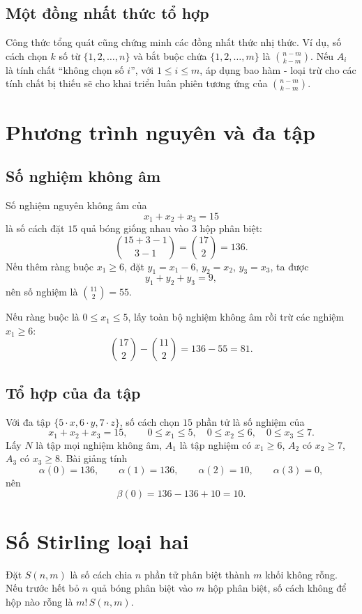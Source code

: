 \documentclass[11pt]{article}
\newcommand{\C}[2]{\binom{#1}{#2}}
\begin{document}
\subsection{Một đồng nhất thức tổ hợp}

Công thức tổng quát cũng chứng minh các đồng nhất thức nhị thức. Ví dụ, số
cách chọn \(k\) số từ \(\{1,2,\ldots,n\}\) và bắt buộc chứa
\(\{1,2,\ldots,m\}\) là \(\C{n-m}{k-m}\). Nếu \(A_i\) là tính chất ``không
chọn số \(i\)'', với \(1\le i\le m\), áp dụng bao hàm - loại trừ cho các tính
chất bị thiếu sẽ cho khai triển luân phiên tương ứng của \(\C{n-m}{k-m}\).

\section{Phương trình nguyên và đa tập}

\subsection{Số nghiệm không âm}

Số nghiệm nguyên không âm của
\[
  x_1+x_2+x_3=15
\]
là số cách đặt \(15\) quả bóng giống nhau vào \(3\) hộp phân biệt:
\[
  \C{15+3-1}{3-1}=\C{17}{2}=136.
\]
Nếu thêm ràng buộc \(x_1\ge6\), đặt \(y_1=x_1-6\), \(y_2=x_2\), \(y_3=x_3\),
ta được
\[
  y_1+y_2+y_3=9,
\]
nên số nghiệm là \(\C{11}{2}=55\).

Nếu ràng buộc là \(0\le x_1\le5\), lấy toàn bộ nghiệm không âm rồi trừ các
nghiệm \(x_1\ge6\):
\[
  \C{17}{2}-\C{11}{2}=136-55=81.
\]

\subsection{Tổ hợp của đa tập}

Với đa tập \(\{5\cdot x,6\cdot y,7\cdot z\}\), số cách chọn \(15\) phần tử là
số nghiệm của
\[
  x_1+x_2+x_3=15,\qquad
  0\le x_1\le5,\quad 0\le x_2\le6,\quad 0\le x_3\le7.
\]
Lấy \(N\) là tập mọi nghiệm không âm, \(A_1\) là tập nghiệm có \(x_1\ge6\),
\(A_2\) có \(x_2\ge7\), \(A_3\) có \(x_3\ge8\). Bài giảng tính
\[
  \alpha(0)=136,\qquad \alpha(1)=136,\qquad
  \alpha(2)=10,\qquad \alpha(3)=0,
\]
nên
\[
  \beta(0)=136-136+10=10.
\]

\section{Số Stirling loại hai}

Đặt \(S(n,m)\) là số cách chia \(n\) phần tử phân biệt thành \(m\) khối không
rỗng. Nếu trước hết bỏ \(n\) quả bóng phân biệt vào \(m\) hộp phân biệt, số
cách không để hộp nào rỗng là \(m!\,S(n,m)\).
\end{document}
